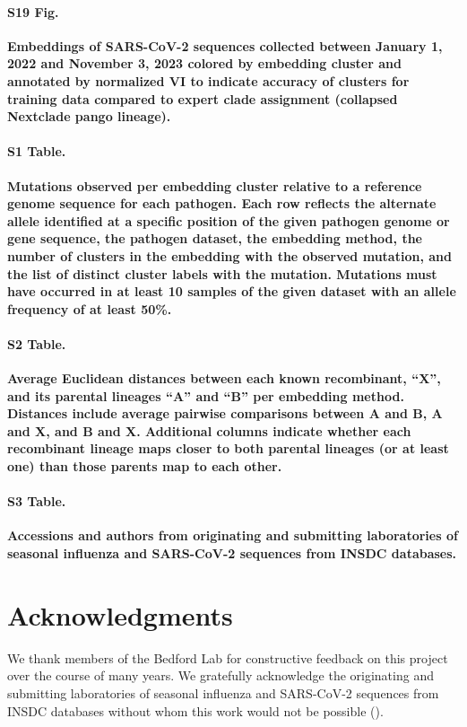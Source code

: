 \documentclass[10pt,letterpaper]{article}
\begin{document}
\paragraph*{S19 Fig.}
\label{S19_Fig_sarscov2_late_embeddings_by_cluster_vs_Nextclade_pango}
{\bf Embeddings of SARS-CoV-2 sequences collected between January 1, 2022 and November 3, 2023 colored by embedding cluster and annotated by normalized VI to indicate accuracy of clusters for training data compared to expert clade assignment (collapsed Nextclade pango lineage).}

\paragraph*{S1 Table.}
\label{S1_Table}
{\bf Mutations observed per embedding cluster relative to a reference genome sequence for each pathogen. Each row reflects the alternate allele identified at a specific position of the given pathogen genome or gene sequence, the pathogen dataset, the embedding method, the number of clusters in the embedding with the observed mutation, and the list of distinct cluster labels with the mutation. Mutations must have occurred in at least 10 samples of the given dataset with an allele frequency of at least 50\%.}

\paragraph*{S2 Table.}
\label{S2_Table}
{\bf Average Euclidean distances between each known recombinant, ``X'', and its parental lineages ``A'' and ``B'' per embedding method. Distances include average pairwise comparisons between A and B, A and X, and B and X. Additional columns indicate whether each recombinant lineage maps closer to both parental lineages (or at least one) than those parents map to each other.}

\paragraph*{S3 Table.}
\label{S3_Table}
{\bf Accessions and authors from originating and submitting laboratories of seasonal influenza and SARS-CoV-2 sequences from INSDC databases.}

\section*{Acknowledgments}

We thank members of the Bedford Lab for constructive feedback on this project over the course of many years.
We gratefully acknowledge the originating and submitting laboratories of seasonal influenza and SARS-CoV-2 sequences from INSDC databases without whom this work would not be possible ().
\end{document}
